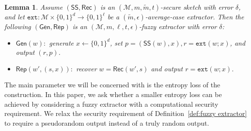 \documentclass[11pt]{article}
\newcommand{\secref}[1]{\mbox{Section~\ref{#1}}}
\newcommand{\defref}[1]{\mbox{Definition~\ref{#1}}}
\newcommand{\class}[1]{{\ensuremath{\mathsf{#1}}}}
\newcommand{\gen}{\ensuremath{\class{Gen}}\xspace}
\newcommand{\rep}{\ensuremath{\class{Rep}}\xspace}
\newcommand{\sketch}{\ensuremath{\class{SS}}\xspace}
\newcommand{\rec}{\ensuremath{\class{Rec}}\xspace}
\newcommand{\zo}{\ensuremath{\{0, 1\}}}
\newcommand{\dis}{\ensuremath{\mathsf{dis}}}
\newcommand{\ext}{\ensuremath{\mathtt{ext}}}
\newtheorem{lemma}[theorem]{Lemma}
\newtheorem{definition}[theorem]{Definition}
\newcommand{\authnote}[2]{{\textcolor{red}{\textsf{#1 notes: }\textcolor{blue}{ #2}}\marginpar{\textcolor{red}{\textbf{!!!!!}}}}}
\newcommand{\authnote}[2]{}
\newcommand{\lnote}[1]{{\authnote{Leo}{#1}}}
\begin{document}
\begin{lemma}%
\label{lem:fuzzy ext construction}
Assume $(\sketch, \rec)$ is an $(\mathcal{M}, m, \tilde{m}, t)$-secure sketch with error $\delta$, and let $\ext:\mathcal{M}\times \zo^d \rightarrow \zo^\ell$ be a $(\tilde{m}, \epsilon)$-average-case extractor.  Then the following $(\gen, \rep)$ is an $(\mathcal{M}, m, \ell, t, \epsilon)$-fuzzy extractor with error $\delta$:
\begin{itemize}
\item $\gen(w):$ generate $x\leftarrow \zo^d$, set $p=(\sketch(w), x), r=\ext(w;x)$, and output $(r,p)$.
\item $\rep(w', (s, x)):$ recover $w=\rec(w',s)$ and output $r=\ext(w;x)$.
\end{itemize}
\end{lemma}
The main parameter we will be concerned with is the entropy loss of the construction.  In this paper, we ask whether a smaller entropy loss can be achieved by considering a fuzzy extractor with a computational security requirement.  We relax the security requirement of \defref{def:fuzzy extractor} to require a pseudorandom output instead of a truly random output.
\end{document}
